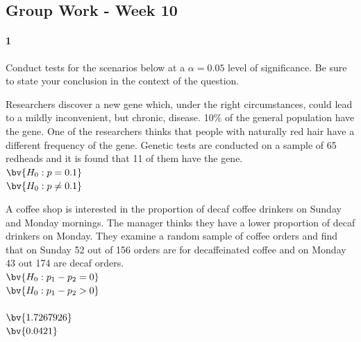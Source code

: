 \documentclass{article}
\begin{document}
\begin{flushleft}
\section*{Group Work - Week 10}

\paragraph{1} Conduct tests for the scenarios below at a $\alpha = 0.05$ level of significance. Be sure to state your conclusion in the context of the question.

\begin{enumalpha}
\item Researchers discover a new gene which, under the right circumstances, could lead to a mildly inconvenient, but chronic, disease. 10\% of the general population have the gene. One of the researchers thinks that people with naturally red hair have a different frequency of the gene. Genetic tests are conducted on a sample of 65 redheads and it is found that 11 of them have the gene. \\
\medskip
$\bv{H_0: p = 0.1}$\\
$\bv{H_0: p \ne 0.1}$\\
\medskip
{}

\vspace{0.5in}

\item A coffee shop is interested in the proportion of decaf coffee drinkers on Sunday and Monday mornings. The manager thinks they have a lower proportion of decaf drinkers on Monday. They examine a random sample of coffee orders and find that on Sunday 52 out of 156 orders are for decaffeinated coffee and on Monday 43 out 174 are decaf orders. \\
\medskip
$\bv{H_0: p_1 - p_2 = 0}$\\
$\bv{H_0: p_1 - p_2 > 0}$\\
\medskip
{}\\
$\bv{1.7267926}$\\
$\bv{0.0421}$\\
\medskip


\end{enumalpha}
\end{flushleft}
\end{document}
